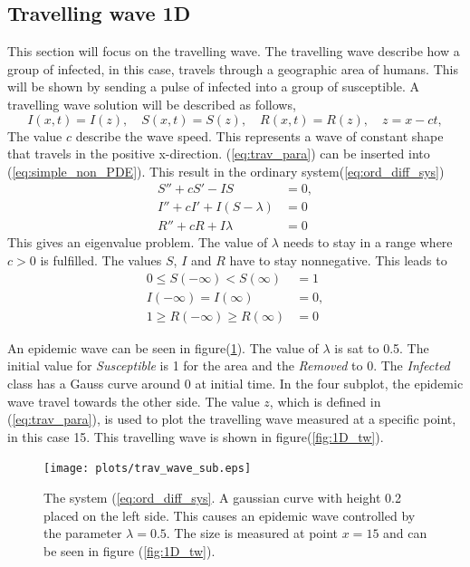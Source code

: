 \documentclass[%
twoside,                 %
final,                   %
10pt]{article}
\begin{document}
\subsection{Travelling wave 1D}
This section will focus on the travelling wave. The travelling wave describe how a group of infected, in this case, travels through a geographic area of humans. This will be shown by sending a pulse of infected into a group of susceptible. A travelling wave solution will be described as follows,
\begin{equation} \label{eq:trav_para}
I(x,t)=I(z),\quad S(x,t)=S(z),\quad R(x,t) = R(z),\quad z = x-ct,
\end{equation}
The value $c$ describe the wave speed. This represents a wave of constant shape that travels in the positive x-direction. (\ref{eq:trav_para}) can be inserted into (\ref{eq:simple_non_PDE}). This result in the ordinary system(\ref{eq:ord_diff_sys})
\begin{equation} \label{eq:ord_diff_sys}
	\begin{aligned}
	S'' + cS' - IS &= 0,\\
	I'' + cI' + I(S-\lambda)&=0\\
	R'' + cR  + I\lambda &=0
	\end{aligned}
\end{equation}
This gives an eigenvalue problem. The value of $\lambda$ needs to stay in a range where $c > 0$ is fulfilled. The values $S$, $I$ and $R$ have to stay nonnegative. This leads to
\begin{equation} 
	\begin{aligned}
	0 \leq S(-\infty) < S(\infty)&=1\\
	I(-\infty)=I(\infty)&=0,\\
	1 \geq R(-\infty)\geq R(\infty) &= 0
	\end{aligned}
\end{equation}

An epidemic wave can be seen in figure(\ref{fig:1D_sub}). The value of $\lambda$ is sat to 0.5. The initial value for \emph{Susceptible} is 1 for the area and the \emph{Removed} to 0. The \emph{Infected} class has a Gauss curve around 0 at initial time. In the four subplot, the epidemic wave travel towards the other side. The value $z$, which is defined in (\ref{eq:trav_para}), is used to plot the travelling wave measured at a specific point, in this case 15. This travelling wave is shown in figure(\ref{fig:1D_tw}).       


\begin{figure}[ht]
  \centerline{\texttt{[image: plots/trav\_wave\_sub.eps]}}
  \caption{
  \label{fig:1D_sub} The system (\ref{eq:ord_diff_sys}. A gaussian curve with height 0.2 placed on the left side. This causes an epidemic wave controlled by the parameter $\lambda=0.5$. The size is measured at point $x=15$ and can be seen in figure (\ref{fig:1D_tw}).
  }
\end{figure}
\end{document}
